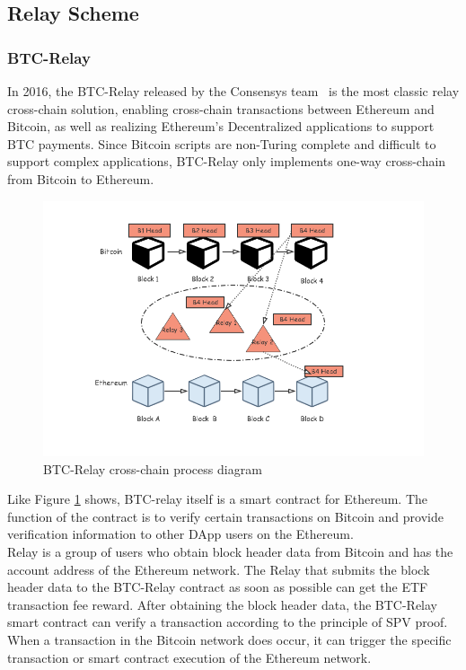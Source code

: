 \subsection{Relay Scheme}
\subsubsection{BTC-Relay}
\noindent In 2016, the BTC-Relay released by the Consensys team~\cite{btc-relay} is the most classic relay cross-chain solution, enabling cross-chain transactions between Ethereum and Bitcoin, as well as realizing Ethereum's Decentralized applications to support BTC payments. Since Bitcoin scripts are non-Turing complete and difficult to support complex applications, BTC-Relay only implements one-way cross-chain from Bitcoin to Ethereum.
        \begin{figure}[H]
        \includegraphics[width=1\textwidth]{./figures/btc.png}
        \centering
        \caption{BTC-Relay cross-chain process diagram}%
        \centering
        \label{fig:btc}
        \end{figure}
\noindent Like Figure \ref{fig:btc} shows, BTC-relay itself is a smart contract for Ethereum. The function of the contract is to verify certain transactions on Bitcoin and provide verification information to other DApp users on the Ethereum. \\

\noindent Relay is a group of users who obtain block header data from Bitcoin and has the account address of the Ethereum network. The Relay that submits the block header data to the BTC-Relay contract as soon as possible can get the ETF transaction fee reward. After obtaining the block header data, the BTC-Relay smart contract can verify a transaction according to the principle of SPV proof. When a transaction in the Bitcoin network does occur, it can trigger the specific transaction or smart contract execution of the Ethereum network.

